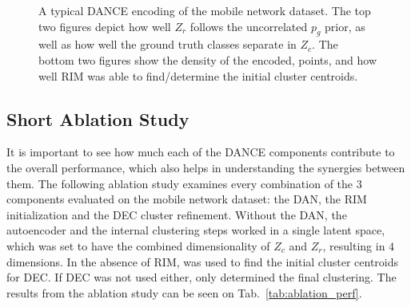 \begin{figure}[!ht]
{					\label{fig:enc_mobile_rim_ass}
				}
				\caption[Typical DANCE encoding of the mobile network dataset]{A typical DANCE encoding of the mobile network dataset. The top two figures depict how well $Z_r$ follows the uncorrelated $p_g$ prior, as well as how well the ground truth classes separate in $Z_c$. The bottom two figures show the density of the encoded, points, and how well \ac{RIM} was able to find/determine the initial cluster centroids.}
				\label{fig:enc_mobile}
			\end{figure}
		
		\subsection{Short Ablation Study}
			
			It is important to see how much each of the \ac{DANCE} components contribute to the overall performance, which also helps in understanding the synergies between them.
			The following ablation study examines every combination of the $3$ components evaluated on the mobile network dataset: the \ac{DAN}, the \ac{RIM} initialization and the \ac{DEC} cluster refinement.
			Without the \ac{DAN}, the autoencoder and the internal clustering steps worked in a single latent space, which was set to have the combined dimensionality of $Z_c$ and $Z_r$, resulting in $4$ dimensions.
			In the absence of \ac{RIM}, \kmeans{} was used to find the initial cluster centroids for \ac{DEC}.
			If \ac{DEC} was not used either, only \kmeans{} determined the final clustering.
			The results from the ablation study can be seen on Tab.~\ref{tab:ablation_perf}.
			
